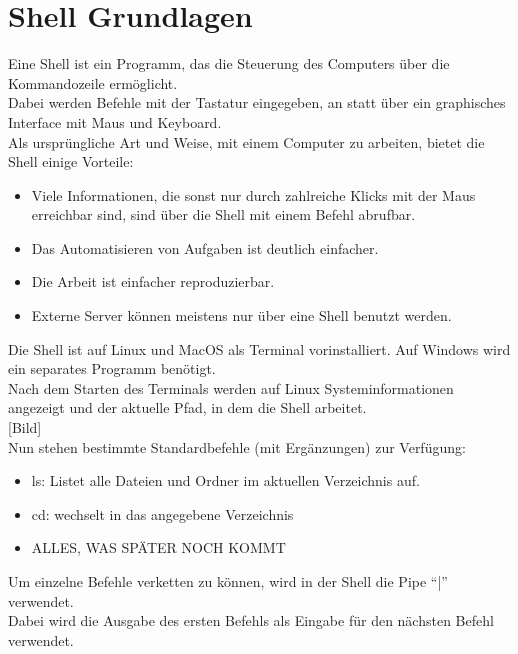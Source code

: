\section{Shell Grundlagen}\label{sec:shell-grundlagen}

Eine Shell ist ein Programm, das die Steuerung des Computers über die Kommandozeile ermöglicht.\\

Dabei werden Befehle mit der Tastatur eingegeben, an statt über ein graphisches Interface mit Maus und Keyboard.\\

Als ursprüngliche Art und Weise, mit einem Computer zu arbeiten, bietet die Shell einige Vorteile:
\begin{itemize}
    \item Viele Informationen, die sonst nur durch zahlreiche Klicks mit der Maus erreichbar sind, sind über die Shell mit einem Befehl abrufbar.
    \item Das Automatisieren von Aufgaben ist deutlich einfacher.
    \item Die Arbeit ist einfacher reproduzierbar.
    \item Externe Server können meistens nur über eine Shell benutzt werden.
\end{itemize}

Die Shell ist auf Linux und MacOS als Terminal vorinstalliert.
Auf Windows wird ein separates Programm benötigt.\\

Nach dem Starten des Terminals werden auf Linux Systeminformationen angezeigt und der aktuelle Pfad, in dem die Shell arbeitet.\\

[Bild]\\

Nun stehen bestimmte Standardbefehle (mit Ergänzungen) zur Verfügung:
\begin{itemize}
    \item ls: Listet alle Dateien und Ordner im aktuellen Verzeichnis auf.
    \item cd: wechselt in das angegebene Verzeichnis
    \item ALLES, WAS SPÄTER NOCH KOMMT
\end{itemize}

Um einzelne Befehle verketten zu können, wird in der Shell die Pipe “|” verwendet.\\
Dabei wird die Ausgabe des ersten Befehls als Eingabe für den nächsten Befehl verwendet.
